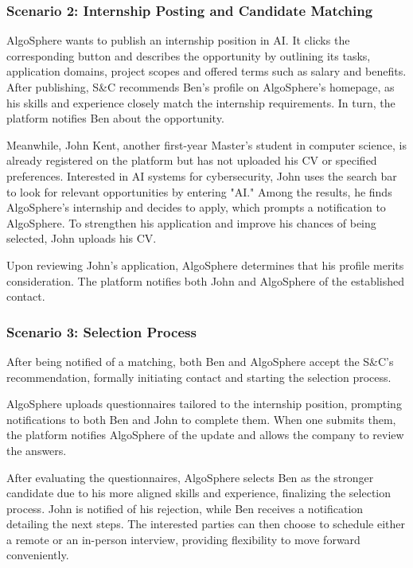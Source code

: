 \subsubsection{Scenario 2: Internship Posting and Candidate Matching}
AlgoSphere wants to publish an internship position in AI. It clicks the corresponding button and describes the opportunity by outlining its tasks, application domains, project scopes and offered terms such as salary and benefits.
After publishing, S\&C recommends Ben’s profile on AlgoSphere’s homepage, as his skills and experience closely match the internship requirements.
In turn, the platform notifies Ben about the opportunity.

Meanwhile, John Kent, another first-year Master's student in computer science, is already registered on the platform but has not uploaded his CV or specified preferences.
Interested in AI systems for cybersecurity, John uses the search bar to look for relevant opportunities by entering "AI."
Among the results, he finds AlgoSphere’s internship and decides to apply, which prompts a notification to AlgoSphere.
To strengthen his application and improve his chances of being selected, John uploads his CV.

Upon reviewing John’s application, AlgoSphere determines that his profile merits consideration. The platform notifies both John and AlgoSphere of the established contact.

\subsubsection{Scenario 3: Selection Process}
After being notified of a matching, both Ben and AlgoSphere accept the S\&C's recommendation, formally initiating contact and starting the selection process.

AlgoSphere uploads questionnaires tailored to the internship position, prompting notifications to both Ben and John to complete them.
When one submits them, the platform notifies AlgoSphere of the update and allows the company to review the answers.

After evaluating the questionnaires, AlgoSphere selects Ben as the stronger candidate due to his more aligned skills and experience, finalizing the selection process.
John is notified of his rejection, while Ben receives a notification detailing the next steps.
The interested parties can then choose to schedule either a remote or an in-person interview, providing flexibility to move forward conveniently.

